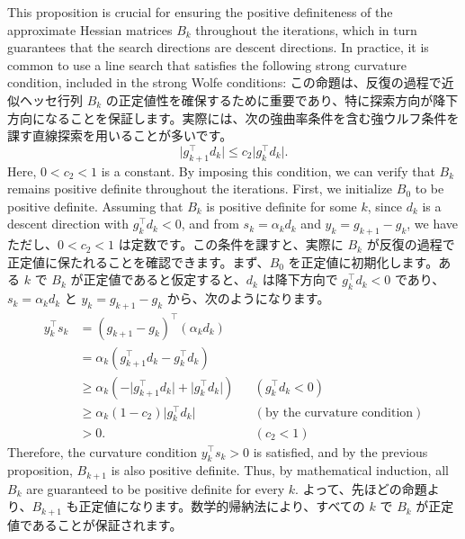 \documentclass[0_main]{subfiles}
\begin{document}
\ifEn
    This proposition is crucial for ensuring the positive definiteness of the approximate Hessian matrices $B_k$ throughout the iterations, which in turn guarantees that the search directions are descent directions. In practice, it is common to use a line search that satisfies the following strong curvature condition, included in the strong Wolfe conditions:
\else
    この命題は、反復の過程で近似ヘッセ行列 $B_k$ の正定値性を確保するために重要であり、特に探索方向が降下方向になることを保証します。実際には、次の強曲率条件を含む強ウルフ条件を課す直線探索を用いることが多いです。
\fi
\begin{equation*}
    \lvert g_{k+1}^\top d_k \rvert \leq c_2 \lvert g_k^\top d_k \rvert.
\end{equation*}
\ifEn
    Here, $0 < c_2 < 1$ is a constant. By imposing this condition, we can verify that $B_k$ remains positive definite throughout the iterations. First, we initialize $B_0$ to be positive definite. Assuming that $B_k$ is positive definite for some $k$, since $d_k$ is a descent direction with $g_k^\top d_k < 0$, and from $s_k = \alpha_k d_k$ and $y_k = g_{k+1} - g_k$, we have
\else
    ただし、$0 < c_2 < 1$ は定数です。この条件を課すと、実際に $B_k$ が反復の過程で正定値に保たれることを確認できます。まず、$B_0$ を正定値に初期化します。ある $k$ で $B_k$ が正定値であると仮定すると、$d_k$ は降下方向で $g_k^\top d_k < 0$ であり、$s_k = \alpha_k d_k$ と $y_k = g_{k+1} - g_k$ から、次のようになります。
\fi
\begin{align*}
    y_k^\top s_k & = (g_{k+1} - g_k)^\top (\alpha_k d_k)                                                                                            \\
                 & = \alpha_k (g_{k+1}^\top d_k - g_k^\top d_k)                                                                                     \\
                 & \geq \alpha_k \left(-\lvert g_{k+1}^\top d_k \rvert + \lvert g_k^\top d_k \rvert\right) &  & (g_k^\top d_k < 0)                  \\
                 & \geq \alpha_k (1 - c_2) \lvert g_k^\top d_k \rvert                                      &  & (\text{by the curvature condition}) \\
                 & > 0.                                                                                    &  & (c_2<1)
\end{align*}
\ifEn
    Therefore, the curvature condition $y_k^\top s_k > 0$ is satisfied, and by the previous proposition, $B_{k+1}$ is also positive definite. Thus, by mathematical induction, all $B_k$ are guaranteed to be positive definite for every $k$.
\else
    よって、先ほどの命題より、$B_{k+1}$ も正定値になります。数学的帰納法により、すべての $k$ で $B_k$ が正定値であることが保証されます。
\fi
\end{document}
